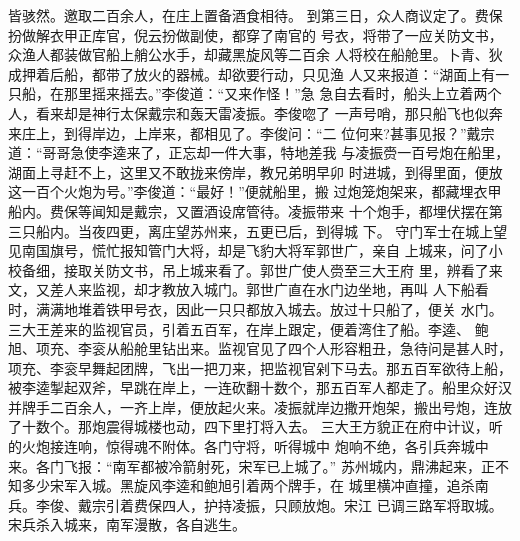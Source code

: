 皆骇然。邀取二百余人，在庄上置备酒食相待。
到第三日，众人商议定了。费保扮做解衣甲正库官，倪云扮做副使，都穿了南官的
号衣，将带了一应关防文书，众渔人都装做官船上艄公水手，却藏黑旋风等二百余
人将校在船舱里。卜青、狄成押着后船，都带了放火的器械。却欲要行动，只见渔
人又来报道：“湖面上有一只船，在那里摇来摇去。”李俊道：“又来作怪！”急
急自去看时，船头上立着两个人，看来却是神行太保戴宗和轰天雷凌振。李俊唿了
一声号哨，那只船飞也似奔来庄上，到得岸边，上岸来，都相见了。李俊问：“二
位何来?甚事见报？”戴宗道：“哥哥急使李逵来了，正忘却一件大事，特地差我
与凌振赍一百号炮在船里，湖面上寻赶不上，这里又不敢拢来傍岸，教兄弟明早卯
时进城，到得里面，便放这一百个火炮为号。”李俊道：“最好！”便就船里，搬
过炮笼炮架来，都藏埋衣甲船内。费保等闻知是戴宗，又置酒设席管待。凌振带来
十个炮手，都埋伏摆在第三只船内。当夜四更，离庄望苏州来，五更已后，到得城
下。
守门军士在城上望见南国旗号，慌忙报知管门大将，却是飞豹大将军郭世广，亲自
上城来，问了小校备细，接取关防文书，吊上城来看了。郭世广使人赍至三大王府
里，辨看了来文，又差人来监视，却才教放入城门。郭世广直在水门边坐地，再叫
人下船看时，满满地堆着铁甲号衣，因此一只只都放入城去。放过十只船了，便关
水门。三大王差来的监视官员，引着五百军，在岸上跟定，便着湾住了船。李逵、
鲍旭、项充、李衮从船舱里钻出来。监视官见了四个人形容粗丑，急待问是甚人时，
项充、李衮早舞起团牌，飞出一把刀来，把监视官剁下马去。那五百军欲待上船，
被李逵掣起双斧，早跳在岸上，一连砍翻十数个，那五百军人都走了。船里众好汉
并牌手二百余人，一齐上岸，便放起火来。凌振就岸边撒开炮架，搬出号炮，连放
了十数个。那炮震得城楼也动，四下里打将入去。
三大王方貌正在府中计议，听的火炮接连响，惊得魂不附体。各门守将，听得城中
炮响不绝，各引兵奔城中来。各门飞报：“南军都被冷箭射死，宋军已上城了。”
苏州城内，鼎沸起来，正不知多少宋军入城。黑旋风李逵和鲍旭引着两个牌手，在
城里横冲直撞，追杀南兵。李俊、戴宗引着费保四人，护持凌振，只顾放炮。宋江
已调三路军将取城。宋兵杀入城来，南军漫散，各自逃生。

